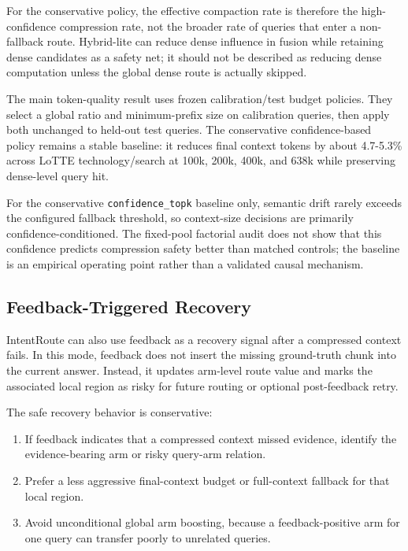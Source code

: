 For the conservative policy, the effective compaction rate is therefore the high-confidence compression rate, not the broader rate of queries that enter a non-fallback route. Hybrid-lite can reduce dense influence in fusion while retaining dense candidates as a safety net; it should not be described as reducing dense computation unless the global dense route is actually skipped.

The main token-quality result uses frozen calibration/test budget policies. They select a global ratio and minimum-prefix size on calibration queries, then apply both unchanged to held-out test queries. The conservative confidence-based policy remains a stable baseline: it reduces final context tokens by about 4.7-5.3\% across LoTTE technology/search at 100k, 200k, 400k, and 638k while preserving dense-level query hit.

For the conservative \nolinkurl{confidence_topk} baseline only, semantic drift rarely exceeds the configured fallback threshold, so context-size decisions are primarily confidence-conditioned. The fixed-pool factorial audit does not show that this confidence predicts compression safety better than matched controls; the baseline is an empirical operating point rather than a validated causal mechanism.

\subsection{Feedback-Triggered Recovery}
\label{sec:04-method:feedback-triggered-recovery}

IntentRoute can also use feedback as a recovery signal after a compressed context fails. In this mode, feedback does not insert the missing ground-truth chunk into the current answer. Instead, it updates arm-level route value and marks the associated local region as risky for future routing or optional post-feedback retry.

The safe recovery behavior is conservative:

\begin{enumerate}
\item If feedback indicates that a compressed context missed evidence, identify the evidence-bearing arm or risky query-arm relation.
\item Prefer a less aggressive final-context budget or full-context fallback for that local region.
\item Avoid unconditional global arm boosting, because a feedback-positive arm for one query can transfer poorly to unrelated queries.
\end{enumerate}


